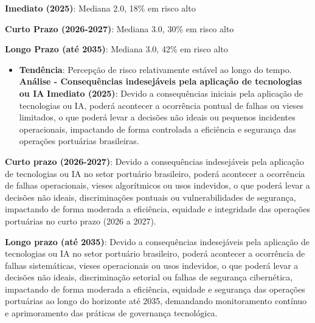\documentclass[
  portuguese,
  letterpaper,
  DIV=11,
  numbers=noendperiod]{scrreprt}
\providecommand{\tightlist}{%
  \setlength{\itemsep}{0pt}\setlength{\parskip}{0pt}}
\begin{document}
\begin{tcolorbox}[enhanced jigsaw, breakable, leftrule=.75mm, opacitybacktitle=0.6, coltitle=black, rightrule=.15mm, colbacktitle=quarto-callout-tip-color!10!white, colframe=quarto-callout-tip-color-frame, titlerule=0mm, bottomtitle=1mm, colback=white, toprule=.15mm, toptitle=1mm, left=2mm, title=\textcolor{quarto-callout-tip-color}{\faLightbulb}\hspace{0.5em}{Destaques}, opacityback=0, bottomrule=.15mm, arc=.35mm]

\textbf{Imediato (2025)}: Mediana 2.0, 18\% em risco alto

\textbf{Curto Prazo (2026-2027)}: Mediana 3.0, 30\% em risco alto

\textbf{Longo Prazo (até 2035)}: Mediana 3.0, 42\% em risco alto

\begin{itemize}
\tightlist
\item
  \textbf{Tendência}: Percepção de risco relativamente estável ao longo
  do tempo. \textbf{Análise - Consequências indesejáveis pela aplicação
  de tecnologias ou IA} \textbf{Imediato (2025)}: Devido a consequências
  iniciais pela aplicação de tecnologias ou IA, poderá acontecer a
  ocorrência pontual de falhas ou vieses limitados, o que poderá levar a
  decisões não ideais ou pequenos incidentes operacionais, impactando de
  forma controlada a eficiência e segurança das operações portuárias
  brasileiras.
\end{itemize}

\textbf{Curto prazo (2026-2027)}: Devido a consequências indesejáveis
pela aplicação de tecnologias ou IA no setor portuário brasileiro,
poderá acontecer a ocorrência de falhas operacionais, vieses
algorítmicos ou usos indevidos, o que poderá levar a decisões não
ideais, discriminações pontuais ou vulnerabilidades de segurança,
impactando de forma moderada a eficiência, equidade e integridade das
operações portuárias no curto prazo (2026 a 2027).

\textbf{Longo prazo (até 2035)}: Devido a consequências indesejáveis
pela aplicação de tecnologias ou IA no setor portuário brasileiro,
poderá acontecer a ocorrência de falhas sistemáticas, vieses
operacionais ou usos indevidos, o que poderá levar a decisões não
ideais, discriminação setorial ou falhas de segurança cibernética,
impactando de forma moderada a eficiência, equidade e segurança das
operações portuárias ao longo do horizonte até 2035, demandando
monitoramento contínuo e aprimoramento das práticas de governança
tecnológica.

\end{tcolorbox}
\end{document}
